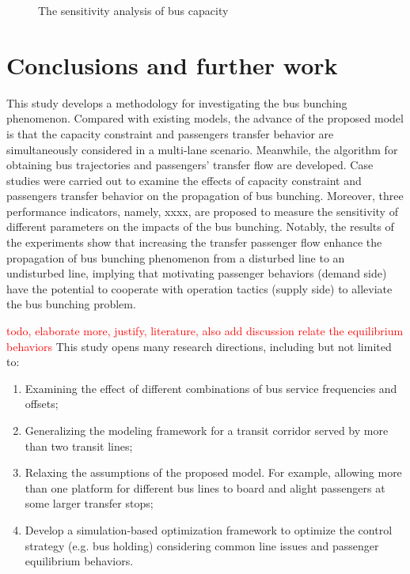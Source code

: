 \documentclass[smallextended]{svjour3}       %
\begin{document}
\begin{Abstract}
\begin{figure}[h]
\begin{tabular}{|c|c|}
      \end{tabular}
      \caption{The sensitivity analysis of bus capacity}
      \label{fig:cap ana}
  \end{figure}

\section{Conclusions and further work}\label{conclusions}
This study develops a methodology for investigating the bus bunching phenomenon.
Compared with existing models, the advance of the proposed model is that the capacity constraint and passengers transfer behavior are simultaneously considered in a multi-lane scenario. Meanwhile, the algorithm for obtaining bus trajectories and passengers' transfer flow are developed. 
Case studies were carried out to examine the effects of capacity constraint and passengers transfer behavior on the propagation of bus bunching. Moreover, three performance indicators, namely, xxxx, are proposed to measure the sensitivity of different parameters on the impacts of the bus bunching. Notably, the results of the experiments show that increasing the transfer passenger flow enhance the propagation of bus bunching phenomenon from a disturbed line to an undisturbed line, implying that motivating passenger behaviors (demand side) have the potential to cooperate with operation tactics (supply side) to alleviate the bus bunching problem.


\textcolor{red}{todo, elaborate more, justify, literature, 
also add discussion relate the equilibrium behaviors
 }
This study opens many research directions, including but not limited to: 
\begin{enumerate}[1)]
    \item Examining the effect of different combinations of bus service frequencies and offsets; 
    \item Generalizing the modeling framework for a transit corridor served by more than two transit lines; 
    \item Relaxing the assumptions of the proposed model. 
    For example, allowing more than one platform for different bus lines to board and alight passengers at some larger transfer stops; 
    \item Develop a simulation-based optimization framework to optimize the control strategy (e.g. bus holding) considering common line issues and passenger equilibrium behaviors.
\end{enumerate}


\end{Abstract}
\end{document}
